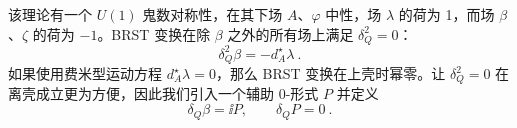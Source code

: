 
该理论有一个 $U(1)$ 鬼数对称性，在其下场 $A$、$\varphi$ 中性，场 $\lambda$ 的荷为 1，而场 $\beta$、$\zeta$ 的荷为 $-1$。BRST 变换在除 $\beta$ 之外的所有场上满足 $\delta_Q^2=0$：
\[ \delta_Q^2\beta = -d_A^{\star}\lambda \ . \]
如果使用费米型运动方程 $d_A^{\star}\lambda=0$，那么 BRST 变换在上壳时幂零。让 $\delta_Q^2=0$ 在离壳成立更为方便，因此我们引入一个辅助 0-形式 $P$ 并定义
\[ \delta_Q\beta = \ii P, \qquad \delta_QP = 0 \ . \]

